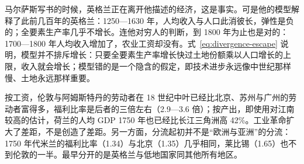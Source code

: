 \begin{pitfall}
马尔萨斯写书的时候，英格兰正在离开他描述的经济，这是事实。可是他的模型解释了此前几百年的英格兰：1250—1630 年，人均收入与人口此消彼长，弹性是负的；全要素生产率几乎不增长。连他对穷人的判断，到 1800 年为止也是对的：1700—1800 年人均收入增加了，农业工资却没有。式~\eqref{eq:divergence-escape} 说明，模型并不排斥增长：只要全要素生产率增长快过土地份额乘以人口增长的上限，收入就会增长；模型错的是一个隐含的假定，即技术进步永远像中世纪那样慢、土地永远那样重要。
\end{pitfall}

\begin{pitfall}
按工资，伦敦与阿姆斯特丹的劳动者在 18 世纪中叶已经比北京、苏州与广州的劳动者富得多，福利比率是后者的三倍左右（2.9—3.6 倍）；按产出，即使用对江南较高的估计，荷兰的人均 GDP 1750 年也已经比长江三角洲高 42\%。工业革命扩大了差距，不是创造了差距。另一方面，分流起初并不是“欧洲与亚洲”的分流：1750 年代米兰的福利比率（1.34）与北京（1.35）几乎相同，莱比锡（1.65）也不到伦敦的一半。最早分开的是英格兰与低地国家同其他所有地区。
\end{pitfall}

